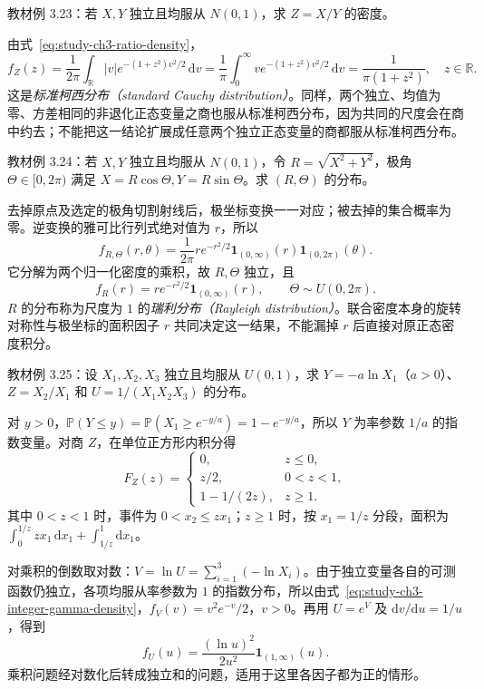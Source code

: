\begin{example}
\label{ex:study-ch3-standard-cauchy-ratio}
教材例 3.23：若 $X,Y$ 独立且均服从 $N(0,1)$，求 $Z=X/Y$ 的密度。
\end{example}

\begin{solve}
由式~\eqref{eq:study-ch3-ratio-density}，
\[
  f_Z(z)=\frac1{2\pi}\int_{\mathbb R}|v|
    e^{-(1+z^2)v^2/2}\,\mathrm dv
  =\frac1\pi\int_0^\infty v e^{-(1+z^2)v^2/2}\,\mathrm dv
  =\frac1{\pi(1+z^2)},\quad z\in\mathbb R.
\]
这是\emph{标准柯西分布（standard Cauchy distribution）}。同样，两个独立、均值为零、方差相同的非退化正态变量之商也服从标准柯西分布，因为共同的尺度会在商中约去；不能把这一结论扩展成任意两个独立正态变量的商都服从标准柯西分布。
\end{solve}

\begin{example}
\label{ex:study-ch3-normal-polar}
教材例 3.24：若 $X,Y$ 独立且均服从 $N(0,1)$，令 $R=\sqrt{X^2+Y^2}$，极角 $\Theta\in[0,2\pi)$ 满足 $X=R\cos\Theta,Y=R\sin\Theta$。求 $(R,\Theta)$ 的分布。
\end{example}

\begin{solve}
去掉原点及选定的极角切割射线后，极坐标变换一一对应；被去掉的集合概率为零。逆变换的雅可比行列式绝对值为 $r$，所以
\[
  f_{R,\Theta}(r,\theta)
  =\frac1{2\pi}r e^{-r^2/2}
    \boldsymbol 1_{(0,\infty)}(r)\boldsymbol 1_{(0,2\pi)}(\theta).
\]
它分解为两个归一化密度的乘积，故 $R,\Theta$ 独立，且
\[
  f_R(r)=r e^{-r^2/2}\boldsymbol 1_{(0,\infty)}(r),\qquad
  \Theta\sim U(0,2\pi).
\]
$R$ 的分布称为尺度为 $1$ 的\emph{瑞利分布（Rayleigh distribution）}。联合密度本身的旋转对称性与极坐标的面积因子 $r$ 共同决定这一结果，不能漏掉 $r$ 后直接对原正态密度积分。
\end{solve}

\begin{example}
\label{ex:study-ch3-uniform-transformations}
教材例 3.25：设 $X_1,X_2,X_3$ 独立且均服从 $U(0,1)$，求 $Y=-a\ln X_1$（$a>0$）、$Z=X_2/X_1$ 和 $U=1/(X_1X_2X_3)$ 的分布。
\end{example}

\begin{solve}
对 $y>0$，$\mathbb P(Y\le y)=\mathbb P(X_1\ge e^{-y/a})=1-e^{-y/a}$，所以 $Y$ 为率参数 $1/a$ 的指数变量。对商 $Z$，在单位正方形内积分得
\[
  F_Z(z)=
  \begin{cases}
    0,&z\le0,\\
    z/2,&0<z<1,\\
    1-1/(2z),&z\ge1.
  \end{cases}
\]
其中 $0<z<1$ 时，事件为 $0<x_2\le zx_1$；$z\ge1$ 时，按 $x_1=1/z$ 分段，面积为 $\int_0^{1/z}zx_1\,\mathrm dx_1+\int_{1/z}^1\mathrm dx_1$。

对乘积的倒数取对数：$V=\ln U=\sum_{i=1}^3(-\ln X_i)$。由于独立变量各自的可测函数仍独立，各项均服从率参数为 $1$ 的指数分布，所以由式~\eqref{eq:study-ch3-integer-gamma-density}，$f_V(v)=v^2e^{-v}/2$，$v>0$。再用 $U=e^V$ 及 $\mathrm dv/\mathrm du=1/u$，得到
\[
  f_U(u)=\frac{(\ln u)^2}{2u^2}\boldsymbol 1_{(1,\infty)}(u).
\]
乘积问题经对数化后转成独立和的问题，适用于这里各因子都为正的情形。
\end{solve}

